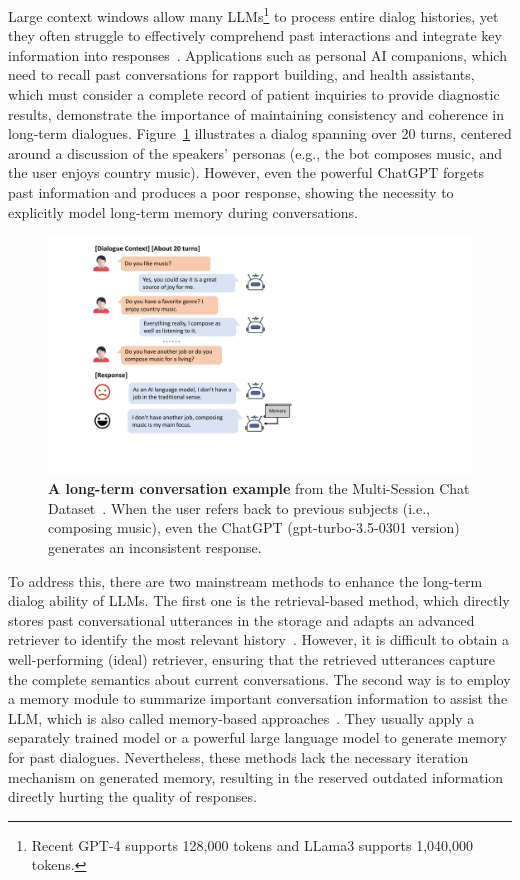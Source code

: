 \documentclass[authoryear,preprint,review,12pt]{elsarticle}
\begin{document}
Large context windows allow many LLMs\footnote{Recent GPT-4 supports 128,000 tokens and LLama3\citep{meta2024llama3} supports 1,040,000 tokens.} to process entire dialog histories, yet they often struggle to effectively comprehend past interactions and integrate key information into responses~\citep{zhou-etal-2023-facilitating}. Applications such as personal AI companions, which need to recall past conversations for rapport building, and health assistants, which must consider a complete record of patient inquiries to provide diagnostic results, demonstrate the importance of maintaining consistency and coherence in long-term dialogues. Figure~\ref{fig:motivation} illustrates a dialog spanning over 20 turns, centered around a discussion of the speakers' personas (e.g., the bot composes music, and the user enjoys country music). However, even the powerful ChatGPT forgets past information and produces a poor response, showing the necessity to explicitly model long-term memory during conversations.
\begin{figure}[t]
  \centering
  \includegraphics[scale=0.4]{motivation.pdf}
  \caption{\textbf{A long-term conversation example} from the Multi-Session Chat Dataset~\citep{xu-etal-2022-beyond}. When the user refers back to previous subjects (i.e., composing music), even the ChatGPT (gpt-turbo-3.5-0301 version) generates an inconsistent response.}
  \label{fig:motivation}
\end{figure}

To address this, there are two mainstream methods to enhance the long-term dialog ability of LLMs. The first one is the retrieval-based method, which directly stores past conversational utterances in the storage and adapts an advanced retriever to identify the most relevant history~\citep{guu2020retrieval,Lewis2020RetrievalAugmentedGF}. However, it is difficult to obtain a well-performing (ideal) retriever, ensuring that the retrieved utterances capture the complete semantics about current conversations. The second way is to employ a memory module to summarize important conversation information to assist the LLM, which is also called memory-based approaches~\citep{mazare-etal-2018-training,longtimenosee, chen2024compress}. They usually apply a separately trained model or a powerful large language model to generate memory for past dialogues. 
Nevertheless, these methods lack the necessary iteration mechanism on generated memory, resulting in the reserved outdated information directly hurting the quality of responses.
\end{document}

